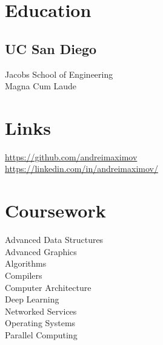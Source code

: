 \documentclass[]{resume}
\begin{document}
%
%
\lastupdated

%
%



%
%

\begin{minipage}[t]{0.33\textwidth}


\section{Education}

\subsection{UC San Diego}
Jacobs School of Engineering \\
Magna Cum Laude \\
\sectionsep


\section{Links}
\href{https://github.com/andreimaximov}{https://github.com/andreimaximov} \\
\href{https://linkedin.com/in/andreimaximov/}{https://linkedin.com/in/andreimaximov/} \\
\sectionsep


\section{Coursework}

Advanced Data Structures \\
Advanced Graphics \\
Algorithms \\
Compilers \\
Computer Architecture \\
Deep Learning \\
Networked Services \\
Operating Systems \\
Parallel Computing


\end{minipage}
\end{document}
